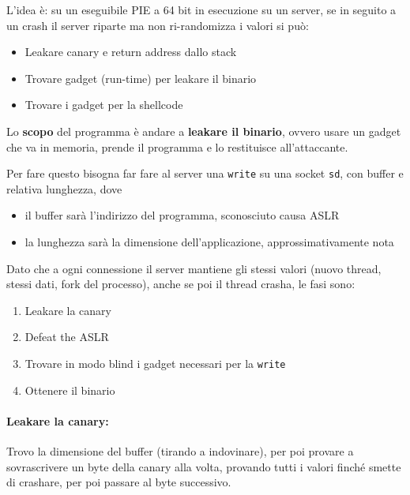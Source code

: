 L'idea è: su un eseguibile PIE a 64 bit in esecuzione su un server, se in seguito a un crash il server riparte ma non ri-randomizza i valori si può: 
\begin{itemize}
	\item Leakare canary e return address dallo stack
	
    \item Trovare gadget (run-time) per leakare il binario
	
    \item Trovare i gadget per la shellcode
\end{itemize}

Lo \textbf{scopo} del programma è andare a \textbf{leakare il binario}, ovvero usare un gadget che va in memoria, prende il programma e lo restituisce all'attaccante. 

Per fare questo bisogna far fare al server una \texttt{write} su una socket \texttt{sd}, con buffer e relativa lunghezza, dove 
\begin{itemize}
	\item il buffer sarà l'indirizzo del programma, sconosciuto causa ASLR
	
    \item la lunghezza sarà la dimensione dell'applicazione, approssimativamente nota
\end{itemize}

Dato che a ogni connessione il server mantiene gli stessi valori (nuovo thread, stessi dati, fork del processo), anche se poi il thread crasha, le fasi sono: 
\begin{enumerate}
	\item Leakare la canary
    
	\item Defeat the ASLR
	
    \item Trovare in modo blind i gadget necessari per la \texttt{write}
	
    \item Ottenere il binario
\end{enumerate}

\paragraph{Leakare la canary:} Trovo la dimensione del buffer (tirando a indovinare), per poi provare a sovrascrivere un byte della canary alla volta, provando tutti i valori finché smette di crashare, per poi passare al byte successivo.

